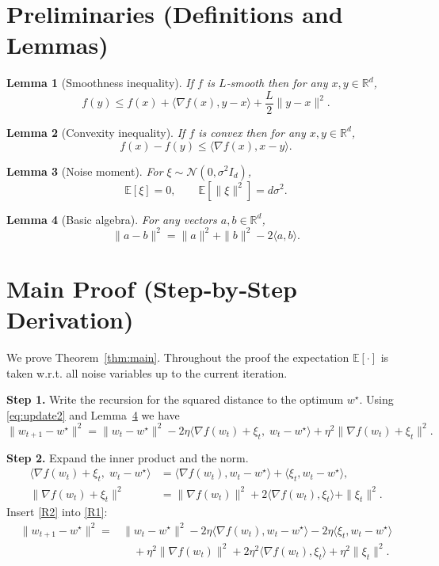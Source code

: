 \documentclass{article}
\newtheorem{lemma}{Lemma}
\newcommand{\E}{\mathbb{E}}
\newcommand{\R}{\mathbb{R}}
\begin{document}
\newpage
\section*{Preliminaries (Definitions and Lemmas)}
\begin{lemma}[Smoothness inequality]\label{lem:smooth}
If $f$ is $L$‑smooth then for any $x,y\in\R^{d}$,
\[
f(y) \le f(x)+\langle\nabla f(x),y-x\rangle+\frac{L}{2}\|y-x\|^2 .
\]
\end{lemma}
\begin{lemma}[Convexity inequality]\label{lem:convex}
If $f$ is convex then for any $x,y\in\R^{d}$,
\[
f(x)-f(y)\le\langle\nabla f(x),x-y\rangle .
\]
\end{lemma}
\begin{lemma}[Noise moment]\label{lem:noise}
For $\xi\sim\mathcal N(0,\sigma^2 I_d)$,
\[
\E[\xi]=0,\qquad \E[\|\xi\|^2]=d\sigma^2 .
\]
\end{lemma}
\begin{lemma}[Basic algebra]\label{lem:algebra}
For any vectors $a,b\in\R^{d}$,
\[
\|a-b\|^2 = \|a\|^2+\|b\|^2-2\langle a,b\rangle .
\]
\end{lemma}

\section*{Main Proof (Step‑by‑Step Derivation)}
We prove Theorem~\ref{thm:main}.  Throughout the proof the expectation $\E[\cdot]$ is taken w.r.t. all noise variables up to the current iteration.

\bigskip
\noindent\textbf{Step 1.}  Write the recursion for the squared distance to the optimum $w^\star$.
Using \eqref{eq:update2} and Lemma~\ref{lem:algebra} we have
\[
\|w_{t+1}-w^\star\|^2
= \|w_t-w^\star\|^2
-2\eta\langle\nabla f(w_t)+\xi_t,\;w_t-w^\star\rangle
+\eta^{2}\|\nabla f(w_t)+\xi_t\|^{2}. \tag{R1}
\]

\noindent\textbf{Step 2.}  Expand the inner product and the norm.
\begin{align}
\langle\nabla f(w_t)+\xi_t,\;w_t-w^\star\rangle
&= \langle\nabla f(w_t),w_t-w^\star\rangle
   +\langle\xi_t,w_t-w^\star\rangle ,\\
\|\nabla f(w_t)+\xi_t\|^{2}
&= \|\nabla f(w_t)\|^{2}
   +2\langle\nabla f(w_t),\xi_t\rangle
   +\|\xi_t\|^{2}. \tag{R2}
\end{align}
Insert \eqref{R2} into \eqref{R1}:
\begin{align}
\|w_{t+1}-w^\star\|^2
=&\|w_t-w^\star\|^2
-2\eta\langle\nabla f(w_t),w_t-w^\star\rangle
-2\eta\langle\xi_t,w_t-w^\star\rangle \nonumber\\
&\quad +\eta^{2}\|\nabla f(w_t)\|^{2}
+2\eta^{2}\langle\nabla f(w_t),\xi_t\rangle
+\eta^{2}\|\xi_t\|^{2}. \tag{R3}
\end{align}
\end{document}
